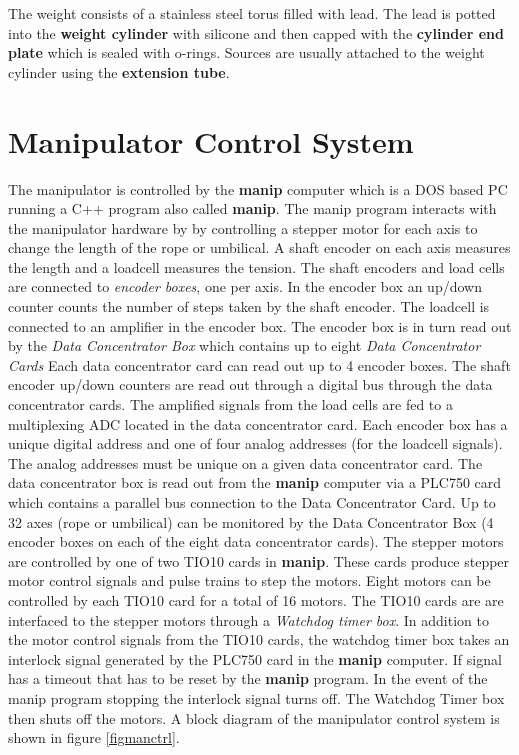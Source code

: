   The weight consists of a stainless steel torus filled with lead.  The
lead is potted into the {\bf weight cylinder} with silicone and 
then capped with the {\bf cylinder end plate} which is sealed with o-rings.
Sources are usually attached to the weight cylinder using the 
{\bf extension tube}.



\section{Manipulator Control System}

  The manipulator is controlled by the {\bf manip} computer
which is a DOS based PC running a C++ program also called {\bf manip}.
The manip program interacts with the manipulator hardware by
by controlling a stepper motor for each axis to change the length
of the rope or umbilical.  A shaft encoder on each axis measures
the length and a loadcell measures the tension.  The shaft encoders
and load cells are connected to {\em encoder boxes}, one per axis.
In the encoder box an up/down counter counts the  number of steps
taken by the shaft encoder.  The loadcell is connected to an amplifier
in the encoder box.  The encoder box is in turn read out
by the {\em Data Concentrator Box} which contains up to eight
{\em Data Concentrator Cards} Each data concentrator card can read
out up to 4 encoder boxes.  The shaft encoder up/down counters 
are read out through a digital bus through the data concentrator cards.
The amplified signals from the load cells are fed to a multiplexing
ADC located in the data concentrator card.  Each encoder box has a
unique digital address and one of four analog addresses (for the 
loadcell signals).  The analog addresses must be unique on a given
data concentrator card.  The data concentrator box is read out
from the {\bf manip} computer via a PLC750 card which contains a
parallel bus connection to the Data Concentrator Card.  Up to 32
axes (rope or umbilical) can be monitored by the Data Concentrator
Box (4 encoder boxes on each of the eight data concentrator cards).
  The stepper motors
are controlled by one of two TIO10 cards in {\bf manip}.  These
cards produce stepper motor control signals and pulse trains to 
step the motors.  Eight motors can be controlled by each TIO10 
card for a total of 16 motors.  The TIO10 cards are 
are interfaced to the stepper motors through a 
{\em Watchdog timer box}.  In addition to the motor control signals
from the TIO10 cards, the watchdog timer box takes an interlock
signal generated by the PLC750 card in the {\bf manip} computer.
If signal has a timeout that has to be reset by the {\bf manip}
program.  In the event of the manip program stopping the interlock
signal turns off.  The Watchdog Timer box then shuts off the motors.
A block diagram of the manipulator control system is shown in
figure \ref{figmanctrl}.
 
